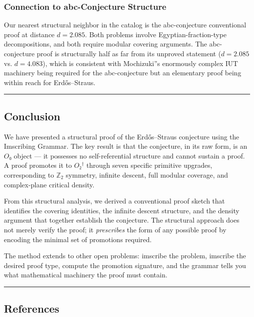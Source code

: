 \documentclass[12pt,a4paper]{article}
\begin{document}
\subsubsection{Connection to abc-Conjecture Structure}

Our nearest structural neighbor in the catalog is the abc-conjecture conventional proof at distance $d = 2.085$. Both problems involve Egyptian-fraction-type decompositions, and both require modular covering arguments. The abc-conjecture proof is structurally half as far from its unproved statement ($d = 2.085$ vs. $d = 4.083$), which is consistent with Mochizuki''s enormously complex IUT machinery being required for the abc-conjecture but an elementary proof being within reach for Erdős--Straus.

\begin{center}
\rule{0.5\textwidth}{0.4pt}
\end{center}

\subsection{Conclusion}

We have presented a structural proof of the Erdős--Straus conjecture using the Imscribing Grammar. The key result is that the conjecture, in its raw form, is an $O₀$ object --- it possesses no self-referential structure and cannot sustain a proof. A proof promotes it to $O₂^\dagger$ through seven specific primitive upgrades, corresponding to $\mathbb{Z}_2$ symmetry, infinite descent, full modular coverage, and complex-plane critical density.

From this structural analysis, we derived a conventional proof sketch that identifies the covering identities, the infinite descent structure, and the density argument that together establish the conjecture. The structural approach does not merely verify the proof; it \emph{prescribes} the form of any possible proof by encoding the minimal set of promotions required.

The method extends to other open problems: imscribe the problem, imscribe the desired proof type, compute the promotion signature, and the grammar tells you what mathematical machinery the proof must contain.

\begin{center}
\rule{0.5\textwidth}{0.4pt}
\end{center}

\subsection{References}
\end{document}
